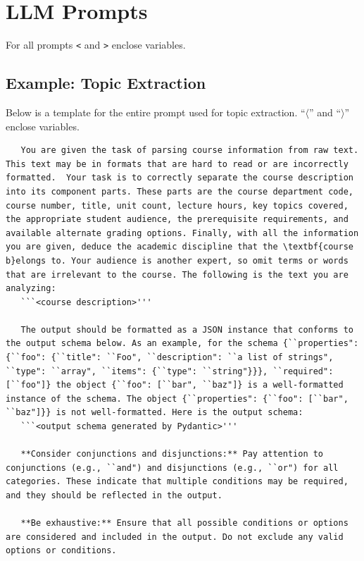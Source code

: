 \appendix
\addappheadtotoc

\chapter{LLM Prompts}\label{app:llmprompts}
For all prompts \verb|<| and \verb|>| enclose variables. 

\section{Example: Topic Extraction}\label{app:extractionprompt}
Below is a template for the entire prompt used for topic extraction. ``$\langle$'' and ``$\rangle$'' enclose variables.
\begin{lstlisting}
   You are given the task of parsing course information from raw text. This text may be in formats that are hard to read or are incorrectly formatted.  Your task is to correctly separate the course description into its component parts. These parts are the course department code, course number, title, unit count, lecture hours, key topics covered, the appropriate student audience, the prerequisite requirements, and available alternate grading options. Finally, with all the information you are given, deduce the academic discipline that the \textbf{course b}elongs to. Your audience is another expert, so omit terms or words that are irrelevant to the course. The following is the text you are analyzing:
   ```<course description>'''
    
   The output should be formatted as a JSON instance that conforms to the output schema below. As an example, for the schema {``properties": {``foo": {``title": ``Foo", ``description": ``a list of strings", ``type": ``array", ``items": {``type": ``string"}}}, ``required": [``foo"]} the object {``foo": [``bar", ``baz"]} is a well-formatted instance of the schema. The object {``properties": {``foo": [``bar", ``baz"]}} is not well-formatted. Here is the output schema:
   ```<output schema generated by Pydantic>'''
    
   **Consider conjunctions and disjunctions:** Pay attention to conjunctions (e.g., ``and") and disjunctions (e.g., ``or") for all categories. These indicate that multiple conditions may be required, and they should be reflected in the output.
    
   **Be exhaustive:** Ensure that all possible conditions or options are considered and included in the output. Do not exclude any valid options or conditions.
    

\end{lstlisting}
